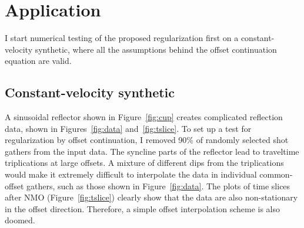   




\section{Application}
I start numerical testing of the proposed regularization first on a
constant-velocity synthetic, where all the assumptions behind the
offset continuation equation are valid.  
%

\subsection{Constant-velocity synthetic}



A sinusoidal reflector shown in Figure~\ref{fig:cup} creates
complicated reflection data, shown in Figures~\ref{fig:data}
and~\ref{fig:tslice}. To set up a test for regularization by offset
continuation, I removed 90\% of randomly selected shot gathers from
the input data.  The syncline parts of the reflector lead to
traveltime triplications at large offsets. A mixture of different dips
from the triplications would make it extremely difficult to
interpolate the data in individual common-offset gathers, such as
those shown in Figure~\ref{fig:data}.  The plots of time slices
after NMO (Figure~\ref{fig:tslice}) clearly show that the data are
also non-stationary in the offset direction.  Therefore, a simple
offset interpolation scheme is also doomed.

